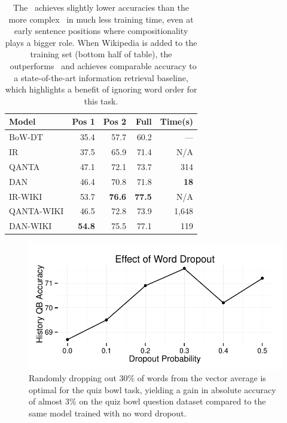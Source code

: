 \begin{table}[t]
\begin{center}
\begin{tabular}{lrrrr}
\toprule
Model    & Pos 1 & Pos 2 & Full & \footnotesize Time(s) \\
\midrule
BoW-DT & 35.4 & 57.7 & 60.2 & --- \\
IR & 37.5 & 65.9 & 71.4 & N/A \\
QANTA & 47.1 & 72.1 & 73.7 & 314 \\
DAN & 46.4 & 70.8 & 71.8 & \bf 18 \\
\midrule
IR-WIKI & 53.7 & \bf 76.6 & \bf 77.5 & N/A\\
QANTA-WIKI & 46.5 & 72.8 & 73.9 & 1,648 \\
DAN-WIKI & \bf 54.8 & 75.5 & 77.1 & 119 \\
\bottomrule
\end{tabular}

\end{center}
\caption{The \dan\ achieves slightly lower accuracies than the more complex \qanta\ in much less training time, even at
  early sentence positions where compositionality plays a bigger role. When Wikipedia is added to the training set (bottom half of table), the \dan\ outperforms \qanta\ and achieves comparable accuracy to a state-of-the-art information retrieval baseline, which highlights a benefit of ignoring word order for this task.}
\label{table:qb}
\end{table}

\begin{figure}	\includegraphics[scale=0.6]{2015_acl_dan/figures/dropout_effect.pdf}
	\caption{Randomly dropping out 30\% of words from the vector average is
          optimal for the quiz bowl task, yielding a gain in absolute accuracy
          of almost 3\% on the quiz bowl question dataset compared to the same model trained with no word dropout.}
\label{fig:sdrop}

\end{figure}

